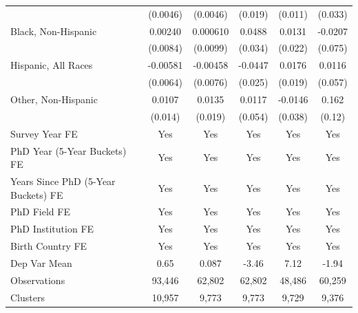 \begin{table}[htbp]
\begin{tabular}{l*{5}{c}}
  &    (0.0046)         &    (0.0046)         &     (0.019)         &     (0.011)         &     (0.033)         \\
[1em]
Black, Non-Hispanic&     0.00240         &    0.000610         &      0.0488         &      0.0131         &     -0.0207         \\
  &    (0.0084)         &    (0.0099)         &     (0.034)         &     (0.022)         &     (0.075)         \\
[1em]
Hispanic, All Races&    -0.00581         &    -0.00458         &     -0.0447\sym{*}  &      0.0176         &      0.0116         \\
  &    (0.0064)         &    (0.0076)         &     (0.025)         &     (0.019)         &     (0.057)         \\
[1em]
Other, Non-Hispanic&      0.0107         &      0.0135         &      0.0117         &     -0.0146         &       0.162         \\
  &     (0.014)         &     (0.019)         &     (0.054)         &     (0.038)         &      (0.12)         \\
[1em]
Survey Year FE&         Yes         &         Yes         &         Yes         &         Yes         &         Yes         \\
[1em]
PhD Year (5-Year Buckets) FE&         Yes         &         Yes         &         Yes         &         Yes         &         Yes         \\
[1em]
Years Since PhD (5-Year Buckets) FE&         Yes         &         Yes         &         Yes         &         Yes         &         Yes         \\
[1em]
PhD Field FE&         Yes         &         Yes         &         Yes         &         Yes         &         Yes         \\
[1em]
PhD Institution FE&         Yes         &         Yes         &         Yes         &         Yes         &         Yes         \\
[1em]
Birth Country FE&         Yes         &         Yes         &         Yes         &         Yes         &         Yes         \\
\hline
Dep Var Mean&        0.65         &       0.087         &       -3.46         &        7.12         &       -1.94         \\
Observations&      93,446         &      62,802         &      62,802         &      48,486         &      60,259         \\
Clusters&      10,957         &       9,773         &       9,773         &       9,729         &       9,376         \\

\end{tabular}
\end{table}
